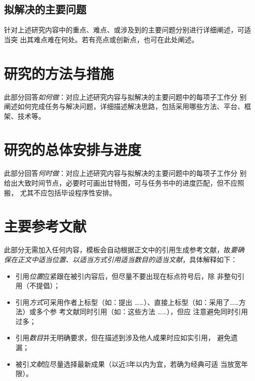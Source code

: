 \subsection{拟解决的主要问题}

\begin{tcolorbox}
	针对上述研究内容中的重点、难点、或涉及到的主要问题分别进行详细阐述，可适当突
	出其难点难在何处。若有亮点或创新点，也可在此处阐述。
\end{tcolorbox}

\section{研究的方法与措施}

\begin{tcolorbox}
	此部分回答\emph{如何做}：对应上述研究内容与拟解决的主要问题中的每项子工作分
	别阐述如何完成任务与解决问题，详细描述解决思路，包括采用哪些方法、平台、框
	架、技术等。
\end{tcolorbox}

\section{研究的总体安排与进度}

\begin{tcolorbox}
	此部分回答\emph{何时做}：对应上述研究内容与拟解决的主要问题中的每项子工作分
	别给出大致时间节点，必要时可画出甘特图，可与任务书中的进度匹配，但不应照搬，
	尤其不应包括毕设程序性安排。
\end{tcolorbox}

\section{主要参考文献}

\begin{tcolorbox}
	此部分无需加入任何内容，模板会自动根据正文中的引用生成参考文献，故\emph{要确
		保在正文中适当位置、以适当方式引用适当数目的适当文献}，具体解释如下：
	\begin{itemize}
		\item 引用\emph{位置}应紧跟在被引内容后，但尽量不要出现在标点符号后，除
		      非整句引用（不提倡）；
		\item 引用\emph{方式}可采用作者上标型（如：\citet{chen1980zhongguo}提出
		      ……）、直接上标型（如：采用了……方法\citep{chen2005zhulu}）或多个参
		      考文献同时引用（如：这些方法
		      \citep{Bohan1928,chu2004tushu,Dubrovin1906,hls2012jinji}……），但应
		      注意避免同时引用过多；
		\item 引用\emph{数目}并无明确要求，但在描述到涉及他人成果时应如实引用，
		      避免遗漏；
		\item 被引\emph{文献}应尽量选择最新成果（以近3年以内为宜，若确为经典可适
		      当放宽年限）。
	\end{itemize}
\end{tcolorbox}